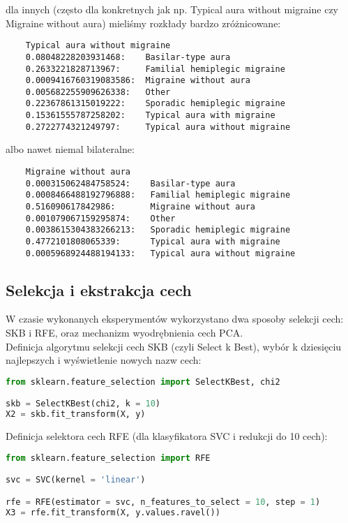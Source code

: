 dla innych (często dla konkretnych jak np. Typical aura without migraine czy Migraine without aura) mieliśmy rozkłady bardzo zróżnicowane:

\begin{verbatim}
    Typical aura without migraine
    0.08048228203931468:    Basilar-type aura
    0.2633221828713967:     Familial hemiplegic migraine
    0.0009416760319083586:  Migraine without aura
    0.005682255909626338:   Other
    0.22367861315019222:    Sporadic hemiplegic migraine
    0.15361555787258202:    Typical aura with migraine
    0.2722774321249797:     Typical aura without migraine
\end{verbatim}
albo nawet niemal bilateralne:

\begin{verbatim}
    Migraine without aura
    0.000315062484758524:    Basilar-type aura
    0.0008466488192796888:   Familial hemiplegic migraine
    0.516090617842986:       Migraine without aura
    0.001079067159295874:    Other
    0.0038615304383266213:   Sporadic hemiplegic migraine
    0.4772101808065339:      Typical aura with migraine
    0.0005968924488194133:   Typical aura without migraine
\end{verbatim}

\subsection{Selekcja i ekstrakcja cech}
W czasie wykonanych eksperymentów wykorzystano dwa sposoby selekcji cech: SKB i RFE, oraz mechanizm wyodrębnienia cech PCA.\\

Definicja algorytmu selekcji cech SKB (czyli Select k Best), wybór k dziesięciu najlepszych i wyświetlenie nowych nazw cech:
\begin{lstlisting}[language=Python, caption=Definicja selektora SKB]
from sklearn.feature_selection import SelectKBest, chi2

skb = SelectKBest(chi2, k = 10)
X2 = skb.fit_transform(X, y)
\end{lstlisting}

Definicja selektora cech RFE (dla klasyfikatora SVC i redukcji do 10 cech):

\begin{lstlisting}[language=Python, caption=Definicja selektora RFE]
from sklearn.feature_selection import RFE

svc = SVC(kernel = 'linear')

rfe = RFE(estimator = svc, n_features_to_select = 10, step = 1)
X3 = rfe.fit_transform(X, y.values.ravel())
\end{lstlisting}


